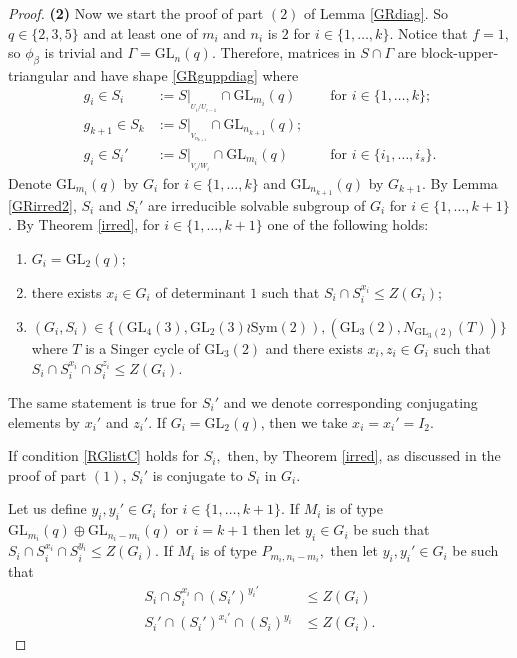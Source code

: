 \documentclass[a4paper,reqno,11pt]{amsart}
\theoremstyle{definition}
\theoremstyle{remark}
\numberwithin{equation}{section}
\newcommand{\Sym}{\mathrm{Sym}}
\newcommand{\Det}{\mathrm{Det}}
\newcommand{\GL}{{\mathrm{GL}}}
\begin{document}
\begin{proof}
{\bf (2)} Now we start the proof of part $(2)$ of Lemma \ref{GRdiag}. So $q \in \{2,3,5\}$ and at least one of $m_i$ and $n_i$ is $2$ for $i \in \{1, \ldots, k\}$. Notice that $f=1$, so $\phi_{\beta}$ is trivial and $\Gamma =\GL_n(q)$. Therefore, matrices in $S \cap \Gamma$ are block-upper-triangular and have shape \eqref{GRguppdiag} where 
\begin{align*}
g_i \in S_i & :=S|_{_{U_i/U_{i-1}}} \cap \GL_{m_i} (q)  &&\text{ for } i\in \{1, \ldots, k\};\\
g_{k+1} \in S_k & := S|_{_{V_{n_{k+1}}}} \cap \GL_{n_{k+1}} (q); &&\\
g_i \in S_i' & :=S|_{_{V_i/W_{i}}} \cap \GL_{m_i} (q) && \text{ for } i\in \{i_1, \ldots, i_s\}.
 \end{align*}
Denote $\GL_{m_i}(q)$ by $G_i$ for $i \in \{1, \ldots, k\}$ and $\GL_{n_{k+1}}(q)$ by $G_{k+1}.$ By Lemma \ref{GRirred2}, $S_i$ and $S_i'$ are irreducible solvable subgroup of $G_i$ for $i \in \{1, \ldots, k+1\}$. By Theorem \ref{irred}, for $i \in \{1, \ldots, k+1\}$ one of the following holds:
\begin{enumerate}[label=(\roman*)]
\item $G_i=\GL_2(q);$ \label{RGlistA} 
\item there exists $x_i \in G_i$ of determinant $1$ such that $S_i \cap S_i^{x_i} \le Z(G_i);$ \label{RGlistB}
\item $(G_i, S_i) \in \{(\GL_4(3),\GL_2(3) \wr \Sym(2)), (\GL_3(2), N_{\GL_3(2)}(T))\}$ where $T$ is a Singer cycle of $\GL_3(2)$ and there exists $x_i, z_i \in G_i$ such that $S_i \cap S_i^{x_i} \cap S_i^{z_i} \le Z(G_i)$.\label{RGlistC}
\end{enumerate}
The same statement is true for $S_i'$ and we denote corresponding conjugating elements by $x_i'$ and $z_i'$. If $G_i=\GL_2(q)$, then we take $x_i=x_i'=I_2.$

 If condition \ref{RGlistC}  holds for $S_i,$ then, by Theorem \ref{irred}, as discussed in the proof of part $(1)$, $S_i'$ is conjugate to $S_i$ in $G_i$. %

Let us define $y_i, y_i' \in G_i$ for $i \in \{1, \ldots, k+1\}.$ %
 If $M_i$ is of type $\GL_{m_i}(q) \oplus \GL_{n_i-m_i}(q)$ or $i=k+1$ then let $y_i \in G_i$ be such that $S_i \cap S_i^{x_i} \cap S_i^{y_i} \le Z(G_i).$ If $M_i$ is of type $P_{m_i, n_i-m_i},$ then let $y_i, y_i' \in G_i$ be such that 
\begin{align*}
S_i \cap S_i^{x_i} \cap (S_i')^{y_i'} & \le Z(G_i)\\
S_i' \cap (S_i')^{x_i'} \cap (S_i)^{y_i} & \le Z(G_i).
\end{align*} 


\end{proof}
\end{document}
